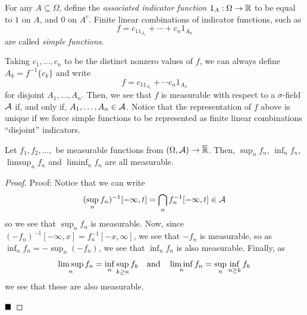 
\begin{definition}
    For any $A \subseteq \Omega$, define the \emph{associated indicator function} $1_{A} : \Omega \to \R$ to be equal to $1$ on $A$, and $0$ on $A^{c}$. Finite linear combinations of indicator functions, such as
    \[ f = c_11_{A_1} + \cdots + c_n1_{A_n} \]
    are called \emph{simple functions}.
\end{definition}

Taking $c_1, \ldots, c_n$ to be the distinct nonzero values of $f$, we can always define $A_{k} = f^{-1}\{c_k\}$ and write
\[ f = c_11_{A_1} + \cdots c_n1_{A_n} \]
for disjoint $A_1, \ldots, A_n$. Then, we see that $f$ is measurable with respect to a $\sigma$-field $\cal{A}$ if, and only if, $A_1, \ldots, A_n \in \cal{A}$. Notice that the representation of $f$ above is unique if we force simple functions to be represented as finite linear combinations ``disjoint'' indicators.

\begin{lemma}
    Let $f_1, f_2, \ldots,$ be measurable functions from $(\Omega, \cal{A}) \to \overline{\R}$. Then, $\sup_{n} f_n$, $\inf_{n} f_n$, $\limsup_{n} f_n$ and $\liminf_{n} f_n$ are all measurable.
\end{lemma}
\begin{proof}{Proof:}
    Notice that we can write
    \[ (\sup_{n} f_n)^{-1}[-\infty, t] = \bigcap_{n} f_{n}^{-1}[-\infty, t] \in \cal{A} \]
    so we see that $\sup_{n}f_n$ is measurable. Now, since $(-f_n)^{-1}[-\infty, x] = f_{n}^{-1}[-x, \infty]$, we see that $-f_n$ is measurable, so as $\inf_{n} f_n = -\sup_{n}(-f_n)$, we see that $\inf_{n}f_n$ is also measurable. Finally, as
    \[ \limsup_{n} f_n = \inf_{n} \sup_{k \geq n} f_k \quand \liminf_{n} f_n = \sup_{n} \inf_{n \geq k} f_{k} \]
    we see that these are also measurable.

    $\qed$
\end{proof}


